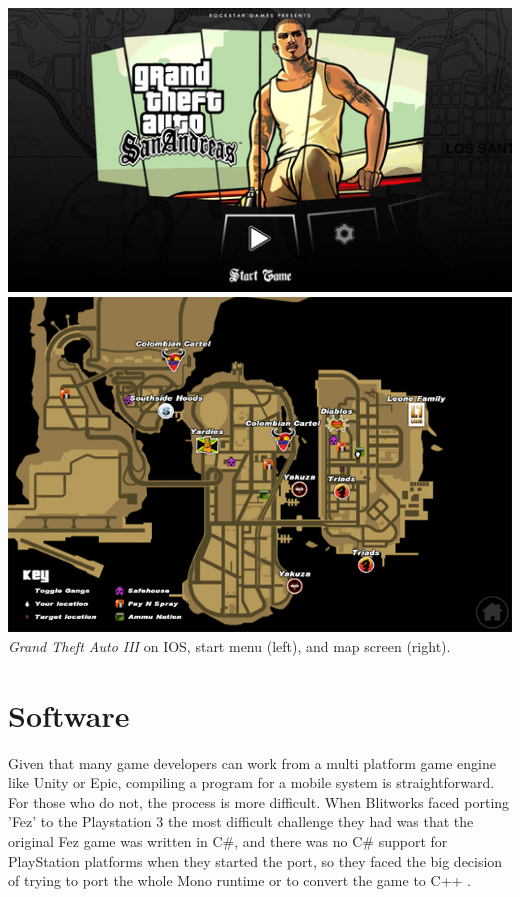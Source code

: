 \documentclass{scrartcl}
\begin{document}
{\includegraphics[scale = 1.05]{GTASanAndreas_IOS_Start_menu}
\includegraphics[scale = 0.27]{GTAIII_IOS_Map}{
    \emph{Grand Theft Auto III} on IOS, start menu (left), and map screen (right).
}

\section*{Software}

Given that many game developers can work from a multi platform game engine like Unity or Epic, compiling a program for a mobile system is straightforward.  For those who do not, the process is more difficult.  When Blitworks faced porting 'Fez' to the Playstation 3 the most difficult challenge they had was that the original Fez game was written in C\#, and there was no C\# support for PlayStation platforms when they started the port, so they faced the big decision of trying to port the whole Mono runtime or to convert the game to C++ \cite {gamasutra2014}.

}
\end{document}
